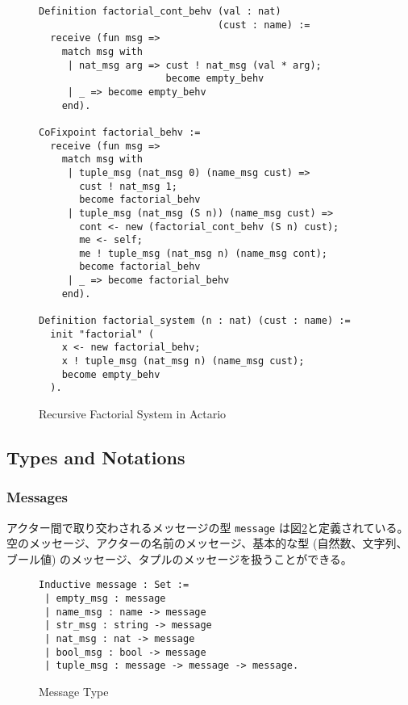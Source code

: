 \begin{figure}[t]
\begin{lstlisting}[style=small]
Definition factorial_cont_behv (val : nat)
                               (cust : name) :=
  receive (fun msg =>
    match msg with
     | nat_msg arg => cust ! nat_msg (val * arg);
                      become empty_behv
     | _ => become empty_behv
    end).

CoFixpoint factorial_behv :=
  receive (fun msg =>
    match msg with
     | tuple_msg (nat_msg 0) (name_msg cust) =>
       cust ! nat_msg 1;
       become factorial_behv
     | tuple_msg (nat_msg (S n)) (name_msg cust) =>
       cont <- new (factorial_cont_behv (S n) cust);
       me <- self;
       me ! tuple_msg (nat_msg n) (name_msg cont);
       become factorial_behv
     | _ => become factorial_behv
    end).

Definition factorial_system (n : nat) (cust : name) :=
  init "factorial" (
    x <- new factorial_behv;
    x ! tuple_msg (nat_msg n) (name_msg cust);
    become empty_behv
  ).
\end{lstlisting}
\caption{Recursive Factorial System in Actario}\label{coq:fact}
\end{figure}



\subsection{Types and Notations}

\subsubsection{Messages}
アクター間で取り交わされるメッセージの型 \texttt{message} は図\ref{coq:message}と定義されている。
空のメッセージ、アクターの名前のメッセージ、基本的な型 (自然数、文字列、ブール値) のメッセージ、タプルのメッセージを扱うことができる。

\begin{figure}[tb]
\begin{lstlisting}
Inductive message : Set :=
 | empty_msg : message
 | name_msg : name -> message
 | str_msg : string -> message
 | nat_msg : nat -> message
 | bool_msg : bool -> message
 | tuple_msg : message -> message -> message.
\end{lstlisting}
\caption{Message Type}\label{coq:message}
\end{figure}


